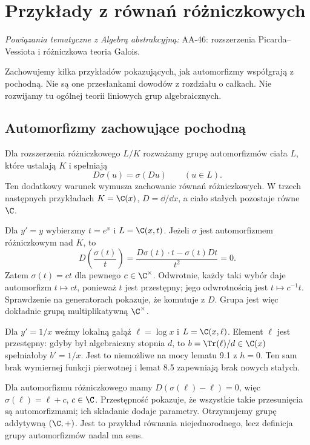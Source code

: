 \chapter{Przykłady z równań różniczkowych}

\providecommand{\atlasref}[2]{#2}
\noindent\emph{Powiązania tematyczne z Algebrą abstrakcyjną:} \atlasref{AA-46::aa:ch:picard-vessiot}{AA-46: rozszerzenia Picarda--Vessiota i różniczkowa teoria Galois}.


Zachowujemy kilka przykładów pokazujących, jak automorfizmy współgrają z pochodną. Nie są one przesłankami dowodów z rozdziału o całkach. Nie rozwijamy tu ogólnej teorii liniowych grup algebraicznych.

\section{Automorfizmy zachowujące pochodną}

Dla rozszerzenia różniczkowego $L/K$ rozważamy grupę automorfizmów ciała $L$, które ustalają $K$ i spełniają
\[
D\sigma(u)=\sigma(Du)\qquad(u\in L).
\]
Ten dodatkowy warunek wymusza zachowanie równań różniczkowych. W trzech następnych przykładach $K=\C(x)$, $D=\dd/\dd x$, a ciało stałych pozostaje równe $\C$.

\begin{przyklad}
Dla $y'=y$ wybierzmy $t=e^x$ i $L=\C(x,t)$. Jeżeli $\sigma$ jest automorfizmem różniczkowym nad $K$, to
\[
D\left(\frac{\sigma(t)}{t}\right)
=\frac{D\sigma(t)\cdot t-\sigma(t)Dt}{t^2}=0.
\]
Zatem $\sigma(t)=ct$ dla pewnego $c\in\C^\times$. Odwrotnie, każdy taki wybór daje automorfizm $t\mapsto ct$, ponieważ $t$ jest przestępny; jego odwrotnością jest $t\mapsto c^{-1}t$. Sprawdzenie na generatorach pokazuje, że komutuje z $D$. Grupa jest więc dokładnie grupą multiplikatywną $\C^\times$.
\end{przyklad}

\begin{przyklad}
Dla $y'=1/x$ weźmy lokalną gałąź $\ell=\log x$ i $L=\C(x,\ell)$. Element $\ell$ jest przestępny: gdyby był algebraiczny stopnia $d$, to $b=\Tr(\ell)/d\in\C(x)$ spełniałoby $b'=1/x$. Jest to niemożliwe na mocy lematu 9.1 z $h=0$. Ten sam brak wymiernej funkcji pierwotnej i lemat 8.5 zapewniają brak nowych stałych.

Dla automorfizmu różniczkowego mamy $D(\sigma(\ell)-\ell)=0$, więc $\sigma(\ell)=\ell+c$, $c\in\C$. Przestępność pokazuje, że wszystkie takie przesunięcia są automorfizmami; ich składanie dodaje parametry. Otrzymujemy grupę addytywną $(\C,+)$. Jest to przykład równania niejednorodnego, lecz definicja grupy automorfizmów nadal ma sens.
\end{przyklad}

